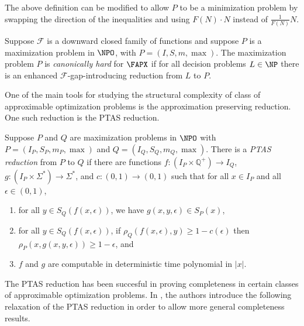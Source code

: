 \documentclass{article}
\begin{document}
The above definition can be modified to allow $P$ to be a minimization problem by swapping the direction of the inequalities and using $F(N) \cdot N$ instead of $\frac{1}{F(N)} N$.

\begin{definition}\label{def:canonicallyhard}
  Suppose $\mathcal{F}$ is a downward closed family of functions and suppose $P$ is a maximization problem in $\NPO$, with $P = (I, S, m, \max)$.
  The maximization problem $P$ is \emph{canonically hard} for $\FAPX$ if for all decision problems $L \in \NP$ there is an enhanced $\mathcal{F}$-gap-introducing reduction from $L$ to $P$.
\end{definition}

One of the main tools for studying the structural complexity of class of approximable optimization problems is the approximation preserving reduction.
One such reduction is the PTAS reduction.

\begin{definition}\label{def:ptasreduction}
  Suppose $P$ and $Q$ are maximization problems in $\NPO$ with $P = (I_P, S_P, m_P, \max)$ and $Q = (I_Q, S_Q, m_Q, \max)$.
  There is a \emph{PTAS reduction} from $P$ to $Q$ if there are functions $f \colon \left(I_P \times \mathbb{Q}^+\right) \to I_Q$, $g \colon \left(I_P \times \Sigma^* \right) \to \Sigma^*$, and $c \colon (0, 1) \to (0, 1)$ such that for all $x \in I_P$ and all $\epsilon \in (0, 1)$,
  \begin{enumerate}
  \item for all $y \in S_Q(f(x, \epsilon))$, we have $g(x, y, \epsilon) \in S_P(x)$,
  \item for all $y \in S_Q(f(x, \epsilon))$, if $\rho_Q(f(x, \epsilon), y) \geq 1 - c(\epsilon)$ then $\rho_P(x, g(x, y, \epsilon)) \geq 1 - \epsilon$, and
  \item $f$ and $g$ are computable in deterministic time polynomial in $|x|$.
  \end{enumerate}
\end{definition}

The PTAS reduction has been succesful in proving completeness in certain classes of approximable optimization problems.
In \cite{ep06}, the authors introduce the following relaxation of the PTAS reduction in order to allow more general completeness results.
\end{document}
